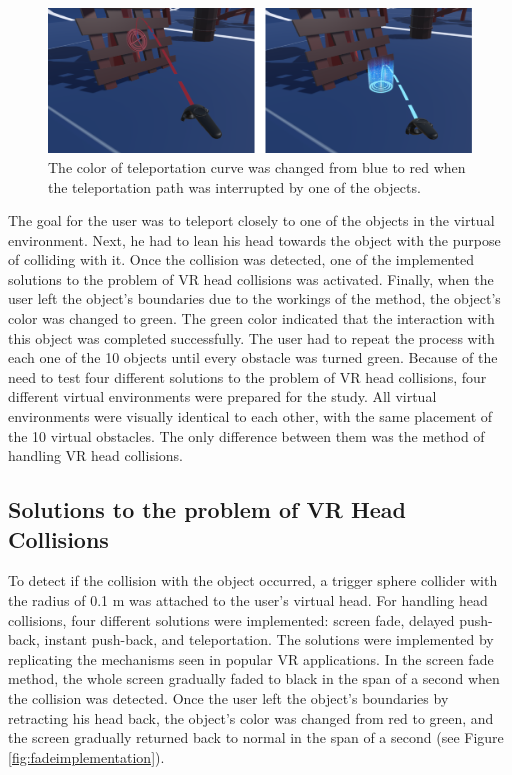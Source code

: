 \begin{figure}[th]
\centering
\includegraphics[width=1\textwidth]{img/implemented_teleportation.png}
\caption{The color of teleportation curve was changed from blue to red when the teleportation path was interrupted by one of the objects.}
\label{fig:tpimplementation}
\end{figure}

The goal for the user was to teleport closely to one of the objects in the virtual environment. Next, he had to lean his head towards the object with the purpose of colliding with it. Once the collision was detected, one of the implemented solutions to the problem of VR head collisions was activated. Finally, when the user left the object's boundaries due to the workings of the method, the object's color was changed to green. The green color indicated that the interaction with this object was completed successfully. The user had to repeat the process with each one of the 10 objects until every obstacle was turned green. Because of the need to test four different solutions to the problem of VR head collisions, four different  virtual environments were prepared for the study. All virtual environments were visually identical to each other, with the same placement of the 10 virtual obstacles. The only difference between them was the method of handling VR head collisions.

\subsection{Solutions to the problem of VR Head Collisions}

To detect if the collision with the object occurred, a trigger sphere collider \cite{SPHERECOLLIDER} with the radius of 0.1 m was attached to the user's virtual head. For handling head collisions, four different solutions were implemented: screen fade, delayed push-back, instant push-back, and teleportation. The solutions were implemented by replicating the mechanisms seen in popular VR applications. In the screen fade method, the whole screen gradually faded to black in the span of a second when the collision was detected. Once the user left the object's boundaries by retracting his head back, the object's color was changed from red to green, and the screen gradually returned back to normal in the span of a second (see Figure \ref{fig:fadeimplementation}). 

